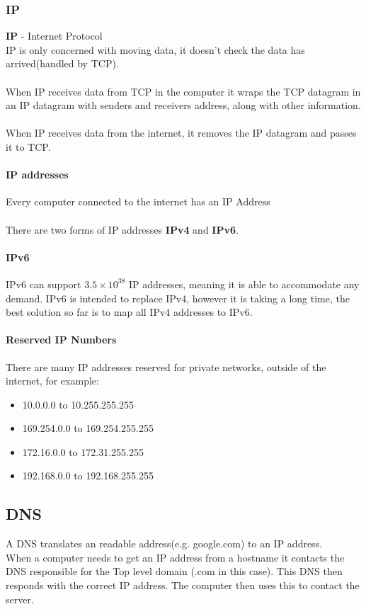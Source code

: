 \documentclass{article}[18pt]
\begin{document}
\subsubsection{IP}
\textbf{IP} - Internet Protocol\\
IP is only concerned with moving data, it doesn't check the data has arrived(handled by TCP).\\
\\
When IP receives data from TCP in the computer it wraps the TCP datagram in an IP datagram with senders and receivers address, along with other information.\\
\\
When IP receives data from the internet, it removes the IP datagram and passes it to TCP.
\paragraph{IP addresses}
Every computer connected to the internet has an IP Address\\
\\
There are two forms of IP addresses \textbf{IPv4} and \textbf{IPv6}.
\paragraph{IPv6}
IPv6 can support $3.5\times10^{38}$ IP addresses, meaning it is able to accommodate any demand. IPv6 is intended to replace IPv4, however it is taking a long time, the best solution so far is to map all IPv4 addresses to IPv6.
\paragraph{Reserved IP Numbers}
There are many IP addresses reserved for private networks, outside of the internet, for example:
\begin{itemize}
\item 10.0.0.0 to 10.255.255.255
\item 169.254.0.0 to 169.254.255.255
\item 172.16.0.0 to 172.31.255.255
\item 192.168.0.0 to 192.168.255.255
\end{itemize}
\subsection{DNS}
A DNS translates an readable address(e.g. google.com) to an IP address.\\
When a computer needs to get an IP address from a hostname it contacts the DNS responsible for the Top level domain (.com in this case). This DNS then responds with the correct IP address. The computer then uses this to contact the server. 
\end{document}
